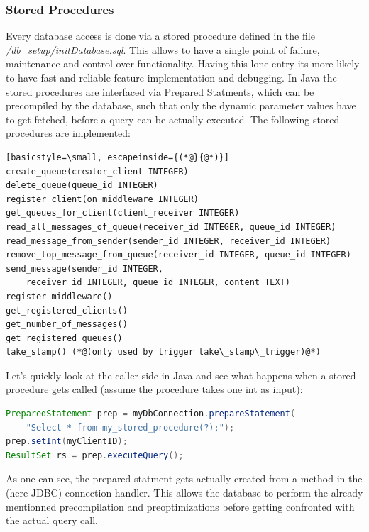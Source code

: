 \documentclass[11pt]{article}
\begin{document}
\subsubsection{Stored Procedures}\label{sec:stored-procedures}
Every database access is done via a stored procedure defined in the file \textit{/db\_setup/initDatabase.sql}. This allows to have a single point of failure, maintenance and control over functionality. Having this lone entry its more likely to have fast and reliable feature implementation and debugging. In Java the stored procedures are interfaced via Prepared Statments, which can be precompiled by the database, such that only the dynamic parameter values have to get fetched, before a query can be actually executed. The following stored procedures are implemented:
\begin{lstlisting}[basicstyle=\small, escapeinside={(*@}{@*)}]
create_queue(creator_client INTEGER)
delete_queue(queue_id INTEGER)
register_client(on_middleware INTEGER)
get_queues_for_client(client_receiver INTEGER)
read_all_messages_of_queue(receiver_id INTEGER, queue_id INTEGER)
read_message_from_sender(sender_id INTEGER, receiver_id INTEGER)
remove_top_message_from_queue(receiver_id INTEGER, queue_id INTEGER)
send_message(sender_id INTEGER,
	receiver_id INTEGER, queue_id INTEGER, content TEXT)
register_middleware()
get_registered_clients()
get_number_of_messages()
get_registered_queues()
take_stamp() (*@(only used by trigger take\_stamp\_trigger)@*)
\end{lstlisting}
Let's quickly look at the caller side in Java and see what happens when a stored procedure gets called (assume the procedure takes one int as input):
\begin{lstlisting}[basicstyle=\small, language=Java, showstringspaces=false]
PreparedStatement prep = myDbConnection.prepareStatement(
	"Select * from my_stored_procedure(?);");
prep.setInt(myClientID);
ResultSet rs = prep.executeQuery();
\end{lstlisting}
As one can see, the prepared statment gets actually created from a method in the (here JDBC) connection handler. This allows the database to perform the already mentionned precompilation and preoptimizations before getting confronted with the actual query call.
\end{document}

